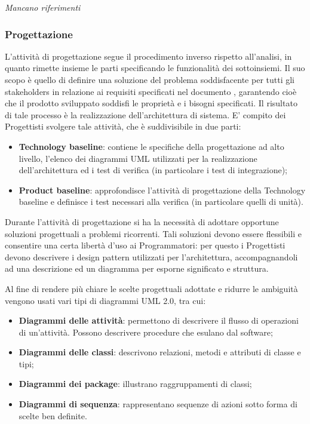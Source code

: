                 \textit{Mancano riferimenti}
                
            \subsubsection{Progettazione}
            L'attività di progettazione segue il procedimento inverso rispetto all'analisi, in quanto rimette insieme le parti specificando le funzionalità dei sottoinsiemi. Il suo scopo è quello di definire una soluzione del problema soddisfacente per tutti gli stakeholders in relazione ai requisiti specificati nel documento \AdR{}, garantendo cioè che il prodotto sviluppato soddisfi le proprietà e i bisogni specificati. Il risultato di tale processo è la realizzazione dell'architettura di sistema.
            E' compito dei Progettisti svolgere tale attività, che è suddivisibile in due parti:
            \begin{itemize}
            	\item{\textbf{Technology baseline}: contiene le specifiche della progettazione ad alto livello, l'elenco dei diagrammi UML utilizzati per la realizzazione dell'architettura ed i test di verifica (in particolare i test di integrazione);}
		\item{\textbf{Product baseline}: approfondisce l'attività di progettazione della Technology baseline e definisce i test necessari alla verifica (in particolare quelli di unità).}
	     \end{itemize}
	     
                	Durante l'attività di progettazione si ha la necessità di adottare opportune soluzioni progettuali a problemi ricorrenti. Tali soluzioni devono essere flessibili e consentire una certa libertà d'uso ai Programmatori: per questo i Progettisti devono descrivere i design pattern utilizzati per l'architettura, accompagnandoli ad una descrizione ed un diagramma per esporne significato e struttura.
	
                Al fine di rendere più chiare le scelte progettuali adottate e ridurre le ambiguità vengono usati vari tipi di diagrammi UML 2.0, tra cui:
                \begin{itemize}
                		\item{\textbf{Diagrammi delle attività}: permettono di descrivere il flusso di operazioni di un'attività. Possono descrivere procedure che esulano dal software;}
			\item{\textbf{Diagrammi delle classi}: descrivono relazioni, metodi e attributi di classe e tipi;}
			\item{\textbf{Diagrammi dei package}: illustrano raggruppamenti di classi;}
			\item{\textbf{Diagrammi di sequenza}: rappresentano sequenze di azioni sotto forma di scelte ben definite.}
                \end{itemize}
                
